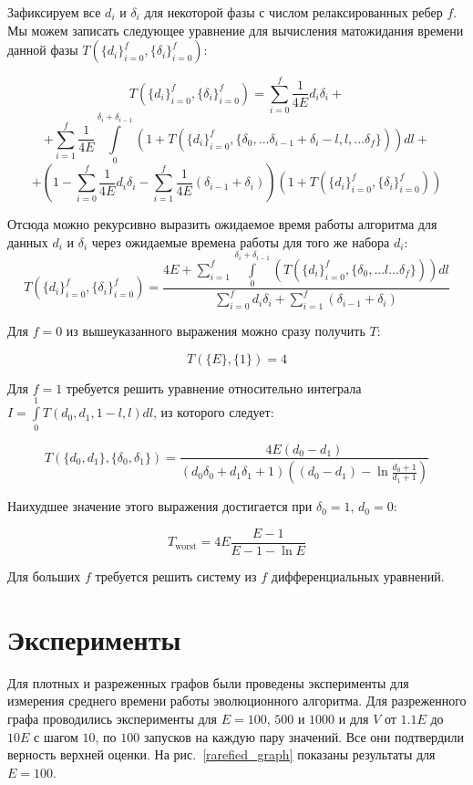 \documentclass{spisok-article}
\begin{document}
Зафиксируем все $d_i$ и $\delta_i$ для некоторой фазы с числом релаксированных ребер $f$. Мы можем записать следующее уравнение для вычисления матожидания времени данной фазы $T(\{d_i\}_{i = 0}^f, \{\delta_i\}_{i = 0}^f)$:

$$T(\{d_i\}_{i = 0}^f, \{\delta_i\}_{i = 0}^f) =  \sum_{i = 0}^f \frac{1}{4E}d_i \delta_i + $$
$$ + \sum_{i = 1}^f \frac{1}{4E} \int\limits_{0}^{\delta_i + \delta_{i - 1}} (1 + T(\{d_i\}_{i = 0}^f, \{\delta_0, ... \delta_{i-1} + \delta_i - l, l, ...\delta_f\}) ) dl + $$
$$ + \left(1 - \sum_{i = 0}^f \frac{1}{4E}d_i \delta_i - \sum_{i = 1}^f \frac{1}{4E}(\delta_{i - 1} + \delta_i) \right)(1 + T(\{d_i\}_{i = 0}^f, \{\delta_i\}_{i = 0}^f))$$

Отсюда можно рекурсивно выразить ожидаемое время работы алгоритма для данных $d_i$ и $\delta_i$ через ожидаемые времена работы для того же набора $d_i$:
$$T(\{d_i\}_{i = 0}^f, \{\delta_i\}_{i = 0}^f) = \frac{4E + \sum_{i = 1}^f\int\limits_{0}^{\delta_i + \delta_{i - 1}} (T(\{d_i\}_{i = 0}^f, \{\delta_0, ... l ...\delta_f\}) ) dl}{\sum_{i = 0}^f d_i \delta_i + \sum_{i = 1}^f (\delta_{i - 1} + \delta_i)}$$

Для $f = 0$ из вышеуказанного выражения можно сразу получить $T$:

$$T(\{E\}, \{1\}) = 4$$

Для $f = 1$ требуется решить уравнение относительно интеграла $I = \int\limits_0^1 T({d_0, d_1}, {1 - l, l}) dl$, из которого следует:

$$T(\{d_0, d_1\}, \{\delta_0, \delta_1\}) = \frac{4E(d_0 - d_1)}{(d_0\delta_0 + d_1\delta_1 + 1)((d_0 - d_1) - \ln\frac{d_0 + 1}{d_1 + 1})}$$

Наихудшее значение этого выражения достигается при $\delta_0 = 1$, $d_0 = 0$:

$$T_\text{worst} = 4E \frac{E - 1}{E - 1 - \ln E}$$

Для больших $f$ требуется решить систему из $f$ дифференциальных уравнений.

\section{Эксперименты}

Для плотных и разреженных графов были проведены эксперименты для измерения среднего времени работы эволюционного алгоритма.
Для разреженного графа проводились эксперименты для $E = 100$, $500$ и $1000$ и для $V$ от $1.1E$ до $10E$ с шагом $10$, по $100$ запусков на каждую пару значений. Все они подтвердили верность верхней оценки. На рис.~\ref{rarefied_graph} показаны результаты для $E = 100$.
\end{document}
